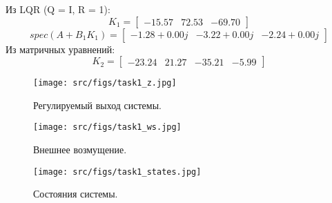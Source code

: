 Из LQR  (Q = I, R = 1):
\[K_1 = \begin{bmatrix}
  -15.57 &  72.53 & -69.70
 \end{bmatrix}\]
 \[spec(A + B_1 K_1) = \begin{bmatrix}
  -1.28 + 0.00j & -3.22 + 0.00j & -2.24 + 0.00j
 \end{bmatrix}\]
 Из матричных уравнений:
 \[K_2 = \begin{bmatrix}
  -23.24 &  21.27 & -35.21 & -5.99
 \end{bmatrix}\]


\begin{figure}[ht!]
  \centering
  \texttt{[image: src/figs/task1\_z.jpg]}
  \caption{Регулируемый выход системы.}
  \label{fig:task1_z}
\end{figure}

\begin{figure}[ht!]
  \centering
  \texttt{[image: src/figs/task1\_ws.jpg]}
  \caption{Внешнее возмущение.}
  \label{fig:task1_ws}
\end{figure}

\begin{figure}[ht!]
  \centering
  \texttt{[image: src/figs/task1\_states.jpg]}
  \caption{Состояния системы.}
  \label{fig:task1_states}
\end{figure}

\FloatBarrier